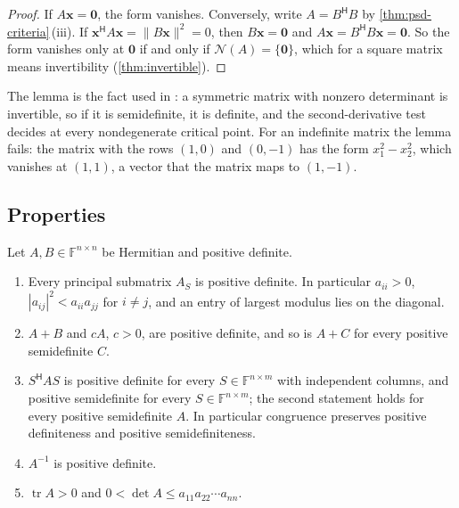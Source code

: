 \begin{proof}
If $A\mathbf x=\mathbf 0$, the form vanishes. Conversely, write $A=B^{\mathsf H}B$ by \cref{thm:psd-criteria}\,(iii). If $\mathbf x^{\mathsf H}A\mathbf x=\|B\mathbf x\|^2=0$, then $B\mathbf x=\mathbf 0$ and $A\mathbf x=B^{\mathsf H}B\mathbf x=\mathbf 0$. So the form vanishes only at $\mathbf 0$ if and only if $\mathcal N(A)=\{\mathbf 0\}$, which for a square matrix means invertibility (\cref{thm:invertible}).
\end{proof}

The lemma is the fact used in : a symmetric matrix with nonzero determinant is invertible, so if it is semidefinite, it is definite, and the second-derivative test decides at every nondegenerate critical point. For an indefinite matrix the lemma fails: the matrix with the rows $(1,0)$ and $(0,-1)$ has the form $x_1^2-x_2^2$, which vanishes at $(1,1)$, a vector that the matrix maps to $(1,-1)$.

\subsection{Properties}

\begin{proposition}
\label{prop:pd-properties}
Let $A,B\in\mathbb F^{n\times n}$ be Hermitian and positive definite.
\begin{enumerate}
\item Every principal submatrix $A_S$ is positive definite. In particular $a_{ii}>0$, $|a_{ij}|^2<a_{ii}a_{jj}$ for $i\ne j$, and an entry of largest modulus lies on the diagonal.
\item $A+B$ and $cA$, $c>0$, are positive definite, and so is $A+C$ for every positive semidefinite $C$.
\item $S^{\mathsf H}AS$ is positive definite for every $S\in\mathbb F^{n\times m}$ with independent columns, and positive semidefinite for every $S\in\mathbb F^{n\times m}$; the second statement holds for every positive semidefinite $A$. In particular congruence preserves positive definiteness and positive semidefiniteness.
\item $A^{-1}$ is positive definite.
\item $\operatorname{tr}A>0$ and $0<\det A\le a_{11}a_{22}\cdots a_{nn}$.
\end{enumerate}
\end{proposition}

